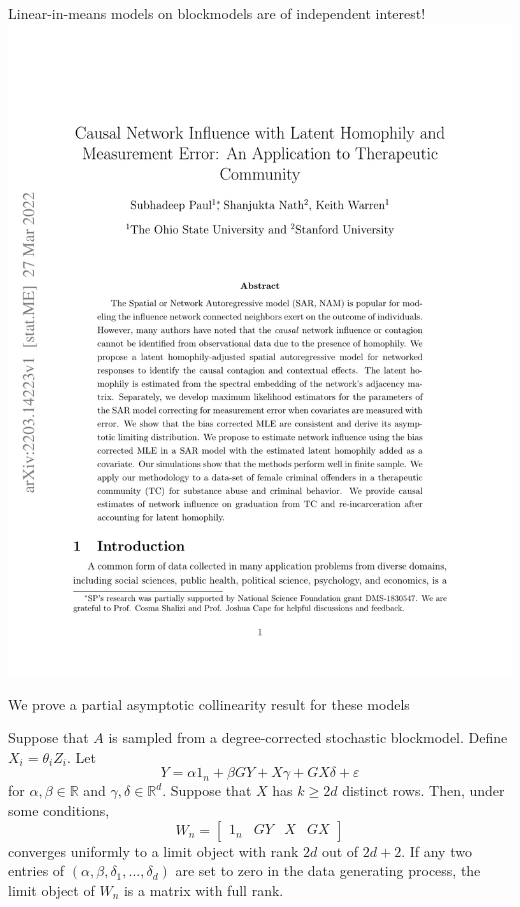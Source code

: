 \documentclass[aspectratio=169]{beamer}
\newcommand{\R}{\mathbb{R}}
\theoremstyle{remark}
\begin{document}
\begin{frame}{Linear-in-means models on blockmodels are of independent interest!}
    \centering
    \includegraphics[height=0.95\textheight, page=1, trim={1.5cm 6cm 0 4cm}, clip]{./papers/paul.pdf}
\end{frame}

\begin{frame}{We prove a partial asymptotic collinearity result for these models}
    \begin{theorem}
        Suppose that $A$ is sampled from a degree-corrected stochastic blockmodel. Define $X_i = \theta_i Z_i$. Let 
        \begin{equation*}
            Y = \alpha 1_n + \beta G Y + X \gamma + G X \delta + \varepsilon
        \end{equation*}
        for $\alpha, \beta \in \R$ and $\gamma, \delta \in \R^d$. Suppose that $X$ has $k \ge 2d$ distinct rows. Then, under some conditions,
        \begin{equation*}
            W_n = \begin{bmatrix}
                1_n & GY & X & GX
            \end{bmatrix}
        \end{equation*}
        converges uniformly to a limit object with rank $2d$ out of $2d + 2$. If any two entries of $(\alpha, \beta, \delta_1, ..., \delta_d)$ are set to zero in the data generating process, the limit object of $W_n$ is a matrix with full rank.
    \end{theorem}
\end{frame}
\end{document}
